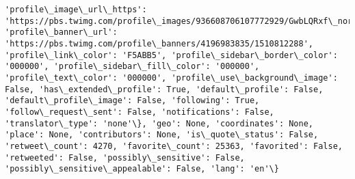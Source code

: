 \documentclass[11pt]{article}
\begin{document}
\begin{Verbatim}[commandchars=\\\{\}]
'profile\_image\_url\_https': 'https://pbs.twimg.com/profile\_images/936608706107772929/GwbLQRxf\_normal.jpg', 'profile\_banner\_url': 'https://pbs.twimg.com/profile\_banners/4196983835/1510812288', 'profile\_link\_color': 'F5ABB5', 'profile\_sidebar\_border\_color': '000000', 'profile\_sidebar\_fill\_color': '000000', 'profile\_text\_color': '000000', 'profile\_use\_background\_image': False, 'has\_extended\_profile': True, 'default\_profile': False, 'default\_profile\_image': False, 'following': True, 'follow\_request\_sent': False, 'notifications': False, 'translator\_type': 'none'\}, 'geo': None, 'coordinates': None, 'place': None, 'contributors': None, 'is\_quote\_status': False, 'retweet\_count': 4270, 'favorite\_count': 25363, 'favorited': False, 'retweeted': False, 'possibly\_sensitive': False, 'possibly\_sensitive\_appealable': False, 'lang': 'en'\}

\end{Verbatim}
\end{document}
